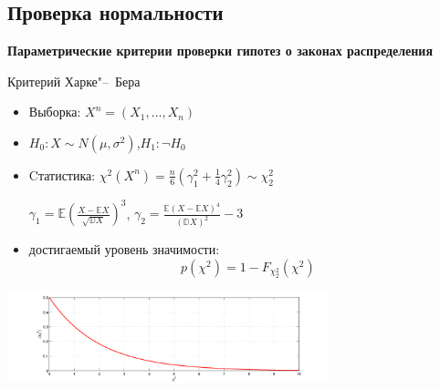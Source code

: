 \documentclass[11pt,pdf,utf8,hyperref={unicode},aspectratio=169]{beamer}
\begin{document}
%

\subsection{Проверка нормальности}
\begin{frame}{}{}
    \centering
    \huge
    \bfseries
    Параметрические критерии проверки гипотез о законах распределения
\end{frame}

\begin{frame}{Критерий Харке"--~Бера}
    \begin{itemize}
        \item Выборка: $X^n=\left(X_1,\ldots,X_n\right)$
        \item $H_0\colon X \sim N\left(\mu,\sigma^2\right)$,\qquad $H_1\colon \lnot H_0$
        \item Cтатистика: \alert{$\chi^2\left(X^n\right) = \frac{n}{6}\left(\gamma_1^2 + \frac1{4} \gamma_2^2\right) \sim \chi^2_2$}

        $\gamma_1 = \mathbb{E} \left( \frac{X-\mathbb{E}X} {\sqrt{\mathbb{D}X}} \right)^3$,
        \qquad
        $\gamma_2 =  \frac{\mathbb{E}\left(X-\mathbb{E}X\right)^4}{\left(\mathbb{D}X\right)^2} - 3$
        \item достигаемый уровень значимости:
           $$
            p\left(\chi^2\right) = 1 - F_{\chi^2_2}\left(\chi^2\right)
           $$
    \end{itemize}
    \includegraphics[width=0.7\textwidth]{chi22.png}
\end{frame}
\end{document}
